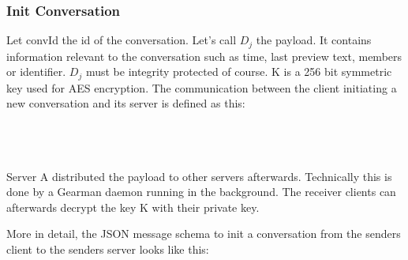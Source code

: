 \documentclass{scrartcl}
\begin{document}
\subsubsection{Init Conversation}
Let convId the id of the conversation. Let's call $D_j$ the payload. It contains information relevant to the conversation such as time, last preview text, members or identifier.  $D_j$ must be integrity protected of course. K is a 256 bit symmetric key used for AES encryption. The communication between the client initiating a new conversation and its server is defined as this: \\\\
\\\\
Server A distributed the payload to other servers afterwards. Technically this is done by a Gearman daemon running in the background. The receiver clients can afterwards decrypt the key K with their private key.

More in detail, the JSON message schema to init a conversation from the senders client to the senders server looks like this:
\end{document}
